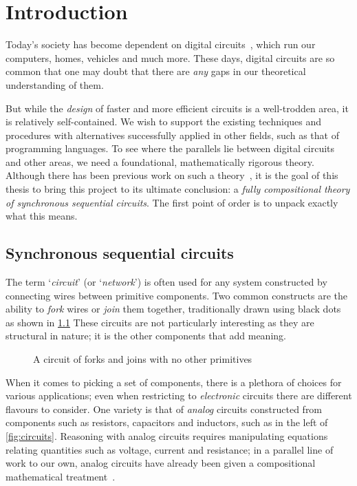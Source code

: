 \chapter{Introduction}

Today's society has become dependent on digital
circuits~\cite{katz2005contemporary}, which run our computers, homes, vehicles
and much more.
These days, digital circuits are so common that one may doubt that there are
\emph{any} gaps in our theoretical understanding of them.

But while the \emph{design} of faster and more efficient circuits is a
well-trodden area, it is relatively self-contained.
We wish to support the existing techniques and procedures with alternatives
successfully applied in other fields, such as that of programming languages.
To see where the parallels lie between digital circuits and other areas,
we need a foundational, mathematically rigorous theory.
Although there has been previous work on such a
theory~\cite{lafont2003algebraic,ghica2017diagrammatic,ghica2018structural}, it
is the goal of this thesis to bring this project to its ultimate conclusion:
a \emph{fully compositional theory of synchronous sequential circuits}.
The first point of order is to unpack exactly what this means.

\section{Synchronous sequential circuits}

The term `\emph{circuit}' (or `\emph{network}') is often used for any system
constructed by connecting wires between primitive components.
Two common constructs are the ability to \emph{fork} wires or \emph{join} them
together, traditionally drawn using black dots as shown in \cref{fig:forkjoin}
These circuits are not particularly interesting as they are structural in
nature; it is the other components that add meaning.

\begin{figure}
    \centering
    \caption{
        A circuit of forks and joins with no other primitives
    }
    \label{fig:forkjoin}
\end{figure}

When it comes to picking a set of components, there is a plethora of choices
for various applications; even when restricting to \emph{electronic} circuits
there are different flavours to consider.
One variety is that of \emph{analog} circuits constructed from components such
as resistors, capacitors and inductors, such as in the left of
\cref{fig:circuits}.
Reasoning with analog circuits requires manipulating equations relating
quantities such as voltage, current and resistance; in a parallel line of work
to our own, analog circuits have already been given a compositional mathematical
treatment~\cite{boisseau2022string}.

